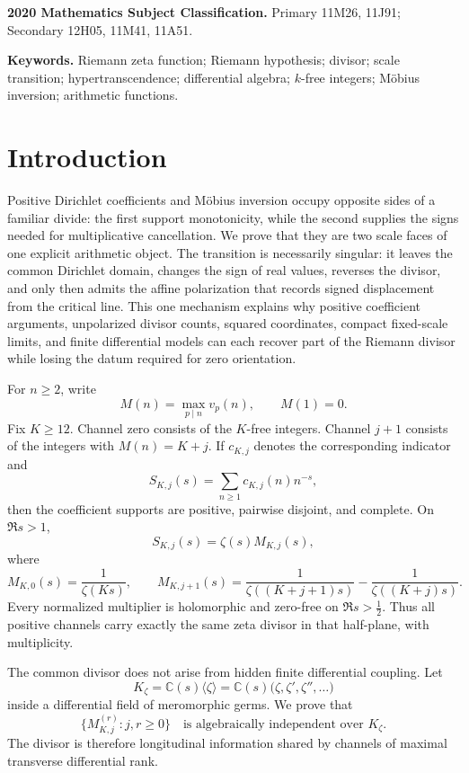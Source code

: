 \documentclass[11pt]{article}
\theoremstyle{definition}
\theoremstyle{remark}
\newcommand{\C}{\mathbb C}
\begin{document}
\medskip
\noindent\textbf{2020 Mathematics Subject Classification.}
Primary 11M26, 11J91; Secondary 12H05, 11M41, 11A51.

\noindent\textbf{Keywords.}
Riemann zeta function; Riemann hypothesis; divisor; scale transition; hypertranscendence;
differential algebra; \(k\)-free integers; M\"obius inversion; arithmetic functions.

\section{Introduction}\label{sec:intro}

Positive Dirichlet coefficients and M\"obius inversion occupy opposite sides of a familiar
divide: the first support monotonicity, while the second supplies the signs needed for
multiplicative cancellation.  We prove that they are two scale faces of one explicit arithmetic
object.  The transition is necessarily singular: it leaves the common Dirichlet domain, changes
the sign of real values, reverses the divisor, and only then admits the affine polarization that
records signed displacement from the critical line.  This one mechanism explains why positive
coefficient arguments, unpolarized divisor counts, squared coordinates, compact fixed-scale
limits, and finite differential models can each recover part of the Riemann divisor while losing
the datum required for zero orientation.

For \(n\geq2\), write
\[
 M(n)=\max_{p\mid n}v_p(n),\qquad M(1)=0.
 \tag{1.1}
\]
Fix \(K\geq12\).  Channel zero consists of the \(K\)-free integers.  Channel \(j+1\) consists
of the integers with \(M(n)=K+j\).  If \(c_{K,j}\) denotes the corresponding indicator and
\[
 S_{K,j}(s)=\sum_{n\geq1}c_{K,j}(n)n^{-s},
 \tag{1.2}
\]
then the coefficient supports are positive, pairwise disjoint, and complete.  On
\(\Re s>1\),
\[
 S_{K,j}(s)=\zeta(s)M_{K,j}(s),
 \tag{1.3}
\]
where
\[
 M_{K,0}(s)=\frac1{\zeta(Ks)},\qquad
 M_{K,j+1}(s)=\frac1{\zeta((K+j+1)s)}
              -\frac1{\zeta((K+j)s)}.
 \tag{1.4}
\]
Every normalized multiplier is holomorphic and zero-free on
\(\Re s>\tfrac12\).  Thus all positive channels carry exactly the same zeta divisor in that
half-plane, with multiplicity.

The common divisor does not arise from hidden finite differential coupling.  Let
\[
 K_\zeta=\C(s)\langle\zeta\rangle
 =\C(s)\bigl(\zeta,\zeta',\zeta'',\ldots\bigr)
 \tag{1.5}
\]
inside a differential field of meromorphic germs.  We prove that
\[
 \{M_{K,j}^{(r)}:j,r\geq0\}
 \quad\text{is algebraically independent over }K_\zeta.
 \tag{1.6}
\]
The divisor is therefore longitudinal information shared by channels of maximal transverse
differential rank.
\end{document}
